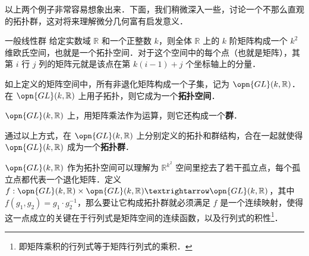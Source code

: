 以上两个例子非常容易想象出来．下面，我们稍微深入一些，讨论一个不那么直观的拓扑群，这对将来理解微分几何富有启发意义．


\begin{example}{一般线性群}\label{TopGrp_ex2}
给定实数域 $\mathbb{R}$ 和一个正整数 $k$，则全体 $\mathbb{R}$ 上的 $k$ 阶矩阵构成一个 $k^2$ 维欧氏空间，也就是一个拓扑空间．对于这个空间中的每个点（也就是矩阵），其第 $i$ 行 $j$ 列的矩阵元就是该点在第 $k(i-1)+j$ 个坐标轴上的分量．

如上定义的矩阵空间中，所有非退化矩阵构成一个子集，记为 $\opn{GL}(k, \mathbb{R})$．在 $\opn{GL}(k,\mathbb{R})$ 上用子拓扑，则它成为一个\textbf{拓扑空间}．

$\opn{GL}(k,\mathbb{R})$ 上，用矩阵乘法作为运算，则它还构成一个\textbf{群}．

通过以上方式，在 $\opn{GL}(k, \mathbb{R})$ 上分别定义的拓扑和群结构，合在一起就使得 $\opn{GL}(k, \mathbb{R})$ 成为一个\textbf{拓扑群}．
\end{example}

$\opn{GL}(k, \mathbb{R})$ 作为拓扑空间可以理解为 $\mathbb{R}^{k^2}$ 空间里挖去了若干孤立点，每个孤立点都代表一个退化矩阵．定义 $f:\opn{GL}(k, \mathbb{R})\times\opn{GL}(k, \mathbb{R})→\opn{GL}(k, \mathbb{R})$，其中 $f(g_1, g_2)=g_1· g_2^{-1}$，那么要让它构成拓扑群就必须满足 $f$ 是一个连续映射，使得这一点成立的关键在于行列式是矩阵空间的连续函数，以及行列式的积性\footnote{即矩阵乘积的行列式等于矩阵行列式的乘积．}．







